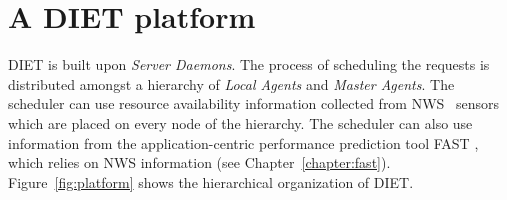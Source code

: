 
\chapter{A DIET platform}
\label{ch:description}

\textsc{DIET} is built upon \emph{Server Daemons}. The process of
scheduling the requests is distributed amongst a hierarchy of
\emph{Local Agents} and \emph{Master Agents}. The scheduler can use
resource availability information collected from NWS~\cite{WSH99}
sensors which are placed on every node of the hierarchy. The
scheduler can also use information from the application-centric
performance prediction tool \textsc{FAST} \cite{Qui02}, which relies
on NWS information (see Chapter~\ref{chapter:fast}).
Figure~\ref{fig:platform} shows the hierarchical organization of
DIET.

